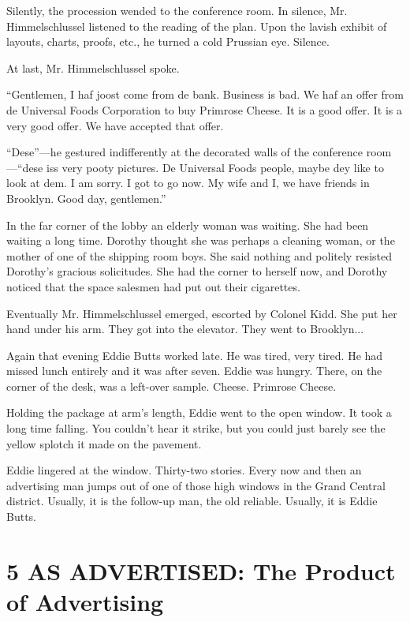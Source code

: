 \documentclass[openany,nobib]{tufte-book}
\let\oldchapter\chapter
\def\chapter{%
  \setcounter{footnote}{0}%
  \oldchapter
}
\begin{document}
Silently, the procession wended to the conference room. In silence, Mr.
Himmelschlussel listened to the reading of the plan. Upon the lavish
exhibit of layouts, charts, proofs, etc., he turned a cold Prussian eye.
Silence.

At last, Mr. Himmelschlussel spoke.

``Gentlemen, I haf joost come from de bank. Business is bad. We haf an
offer from de Universal Foods Corporation to buy Primrose Cheese. It is
a good offer. It is a very good offer. We have accepted that offer.

``Dese''---he gestured indifferently at the decorated walls of the
conference room---``dese iss very pooty pictures. De Universal Foods
people, maybe dey like to look at dem. I am sorry. I got to go now. My
wife and I, we have friends in Brooklyn. Good day, gentlemen.''

In the far corner of the lobby an elderly woman was waiting. She had
been waiting a long time. Dorothy thought she was perhaps a cleaning
woman, or the mother of one of the shipping room boys. She said nothing
and politely resisted Dorothy's gracious solicitudes. She had the corner
to herself now, and Dorothy noticed that the space salesmen had put out
their cigarettes.

Eventually Mr. Himmelschlussel emerged, escorted by Colonel Kidd. She
put her hand under his arm. They got into the elevator. They went to
Brooklyn...

Again that evening Eddie Butts worked late. He was tired, very tired. He
had missed lunch entirely and it was after seven. Eddie was hungry.
There, on the corner of the desk, was a left-over sample. Cheese.
Primrose Cheese.

Holding the package at arm's length, Eddie went to the open window. It
took a long time falling. You couldn't hear it strike, but you could
just barely see the yellow splotch it made on the pavement.

Eddie lingered at the window. Thirty-two stories. Every now and then an
advertising man jumps out of one of those high windows in the Grand
Central district. Usually, it is the follow-up man, the old reliable.
Usually, it is Eddie Butts.



\chapter[5 \hspace*{1mm} AS ADVERTISED: The Product of Advertising]{5 AS ADVERTISED: The Product of Advertising}
\end{document}
